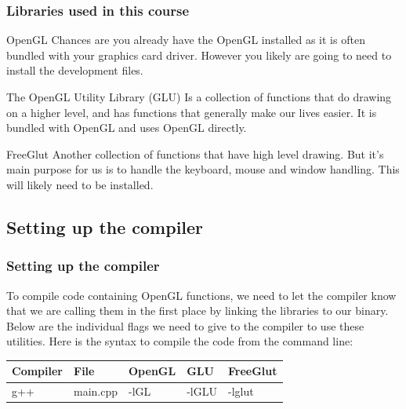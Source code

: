 \documentclass{beamer}
\begin{document}
          \begin{frame}
            \frametitle{Libraries used in this course}
            \begin{block}{OpenGL}
              Chances are you already have the OpenGL installed as it is often bundled with your graphics card driver. However you likely are going to need to install the development files.
            \end{block}

            \begin{block}{The OpenGL Utility Library (GLU)}
              Is a collection of functions that do drawing on a higher level, and has functions that generally make our lives easier. It is bundled with OpenGL and uses OpenGL directly.
            \end{block}

            \begin{block}{FreeGlut}
              Another collection of functions that have high level drawing. But it's main purpose for us is to handle the keyboard, mouse and window handling. This will likely need to be installed.
            \end{block}
          \end{frame}

          \subsection{Setting up the compiler}
          \begin{frame}
            \frametitle{Setting up the compiler}
            To compile code containing OpenGL functions, we need to let the compiler know that we are calling them in the first place by linking the libraries to our binary. Below are the individual flags we need to give to the compiler to use these utilities. Here is the syntax to compile the code from the command line:
            \begin{table}
              \begin{tabular}{l l l l l}
                \toprule
                \textbf{Compiler} & \textbf{File} & \textbf{OpenGL} & \textbf{GLU} & \textbf{FreeGlut}\\
                \midrule
                g++ & main.cpp & -lGL & -lGLU & -lglut \\
                \bottomrule
              \end{tabular}
            \end{table}
          \end{frame}
\end{document}

